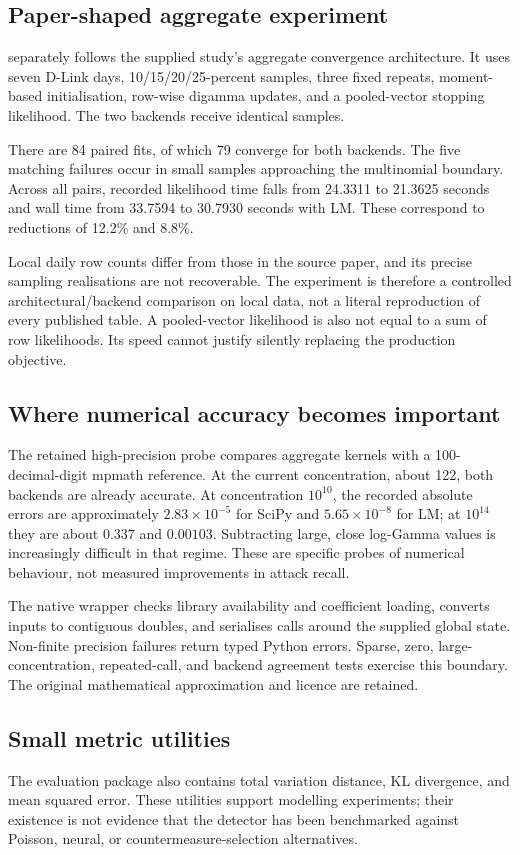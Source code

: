 \subsection{Paper-shaped aggregate experiment}

 separately follows the supplied
study's aggregate convergence architecture. It uses seven D-Link days,
10/15/20/25-percent samples, three fixed repeats, moment-based initialisation,
row-wise digamma updates, and a pooled-vector stopping likelihood.
The two backends receive identical samples.

There are 84 paired fits, of which 79 converge for both backends.
The five matching failures occur in small samples approaching the multinomial
boundary. Across all pairs, recorded likelihood time falls from 24.3311 to
21.3625 seconds and wall time from 33.7594 to 30.7930 seconds with LM.
These correspond to reductions of 12.2\% and 8.8\%.

Local daily row counts differ from those in the source paper, and its precise
sampling realisations are not recoverable. The experiment is therefore a
controlled architectural/backend comparison on local data, not a literal
reproduction of every published table. A pooled-vector likelihood is also not
equal to a sum of row likelihoods. Its speed cannot justify silently replacing
the production objective.

\subsection{Where numerical accuracy becomes important}

The retained high-precision probe compares aggregate kernels with a
100-decimal-digit mpmath reference. At the current concentration, about 122,
both backends are already accurate. At concentration $10^{10}$, the recorded
absolute errors are approximately $2.83\times10^{-5}$ for SciPy and
$5.65\times10^{-8}$ for LM; at $10^{14}$ they are about $0.337$ and $0.00103$.
Subtracting large, close log-Gamma values is increasingly difficult in that
regime. These are specific probes of numerical behaviour, not measured
improvements in attack recall.

The native wrapper checks library availability and coefficient loading, converts
inputs to contiguous doubles, and serialises calls around the supplied global
state. Non-finite precision failures return typed Python errors. Sparse, zero,
large-concentration, repeated-call, and backend agreement tests exercise this
boundary. The original mathematical approximation and licence are retained.

\subsection{Small metric utilities}

The evaluation package also contains total variation distance, KL divergence,
and mean squared error. These utilities support modelling
experiments; their existence is not evidence that the detector has been
benchmarked against Poisson, neural, or countermeasure-selection alternatives.
